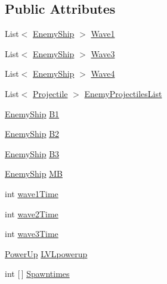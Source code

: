\subsection*{Public Attributes}
\begin{DoxyCompactItemize}
\item 
List$<$ \hyperlink{class_t_d_j___gliese_1_1_enemy_ship}{Enemy\+Ship} $>$ \hyperlink{class_t_d_j___gliese_1_1_l_v_l_a5776de8054cd5e89edde1dc619e7bef3}{Wave1}
\item 
List$<$ \hyperlink{class_t_d_j___gliese_1_1_enemy_ship}{Enemy\+Ship} $>$ \hyperlink{class_t_d_j___gliese_1_1_l_v_l_a3acbe594d5c02022bfd05ce359774cce}{Wave3}
\item 
List$<$ \hyperlink{class_t_d_j___gliese_1_1_enemy_ship}{Enemy\+Ship} $>$ \hyperlink{class_t_d_j___gliese_1_1_l_v_l_a2f82b1c16d7af3fb6f6b80cabc0bcf5b}{Wave4}
\item 
List$<$ \hyperlink{class_t_d_j___gliese_1_1_projectile}{Projectile} $>$ \hyperlink{class_t_d_j___gliese_1_1_l_v_l_aff15a386c2c8a23912cceb3f82b7d4fb}{Enemy\+Projectiles\+List}
\item 
\hyperlink{class_t_d_j___gliese_1_1_enemy_ship}{Enemy\+Ship} \hyperlink{class_t_d_j___gliese_1_1_l_v_l_aaab9650272ee990675e212102bae171f}{B1}
\item 
\hyperlink{class_t_d_j___gliese_1_1_enemy_ship}{Enemy\+Ship} \hyperlink{class_t_d_j___gliese_1_1_l_v_l_a76b806c29150e597473ccd75ec7e83fb}{B2}
\item 
\hyperlink{class_t_d_j___gliese_1_1_enemy_ship}{Enemy\+Ship} \hyperlink{class_t_d_j___gliese_1_1_l_v_l_a86b1b153ab35b94490f5f7cbd234e3f0}{B3}
\item 
\hyperlink{class_t_d_j___gliese_1_1_enemy_ship}{Enemy\+Ship} \hyperlink{class_t_d_j___gliese_1_1_l_v_l_a1cab2204be480949045ae642b53b3ee4}{MB}
\item 
int \hyperlink{class_t_d_j___gliese_1_1_l_v_l_ac5f73d4a33e3f188b277523a65dafcc7}{wave1\+Time}
\item 
int \hyperlink{class_t_d_j___gliese_1_1_l_v_l_ac800c8863c621299f1e3e5e4a9b0da0d}{wave2\+Time}
\item 
int \hyperlink{class_t_d_j___gliese_1_1_l_v_l_a18b306f0c433075602c878fe95b69b66}{wave3\+Time}
\item 
\hyperlink{class_t_d_j___gliese_1_1_power_up}{Power\+Up} \hyperlink{class_t_d_j___gliese_1_1_l_v_l_a94ce5623356b67692c7e4f99309212b5}{L\+V\+Lpowerup}
\item 
int \mbox{[}$\,$\mbox{]} \hyperlink{class_t_d_j___gliese_1_1_l_v_l_aeeee78b5c555039174cb80c85b4b1d2d}{Spawntimes}
\end{DoxyCompactItemize}


